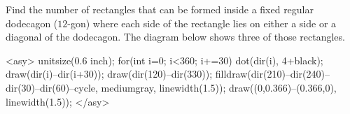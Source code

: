 Find the number of rectangles that can be formed inside a fixed regular dodecagon ($12$-gon) where each side of the rectangle lies on either a side or a diagonal of the dodecagon. The diagram below shows three of those rectangles.

<asy>
unitsize(0.6 inch);
for(int i=0; i<360; i+=30) {
dot(dir(i), 4+black);
draw(dir(i)--dir(i+30));
}
draw(dir(120)--dir(330));
filldraw(dir(210)--dir(240)--dir(30)--dir(60)--cycle, mediumgray, linewidth(1.5));
draw((0,0.366)--(0.366,0), linewidth(1.5));
</asy>
